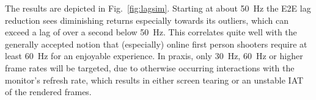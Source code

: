 The results are depicted in Fig.~\ref{fig:lagsim}. Starting at about \SI{50}{\hertz} the \gls{E2E} lag reduction sees diminishing returns especially towards its outliers, which can exceed a lag of over a second below \SI{50}{\hertz}. This correlates quite well with the generally accepted notion that (especially) online first person shooters require at least \SI{60}{\hertz} for an enjoyable experience. In praxis, only \SI{30}{\hertz}, \SI{60}{\hertz} or higher frame rates will be targeted, due to otherwise occurring interactions with the monitor's refresh rate, which results in either screen tearing or an unstable \gls{IAT} of the rendered frames.
